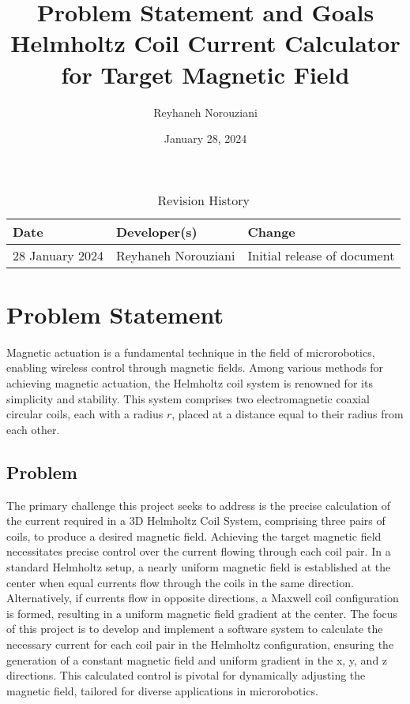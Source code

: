 \documentclass{article}
\title{Problem Statement and Goals\\Helmholtz Coil Current Calculator for Target Magnetic Field}
\author{Reyhaneh Norouziani}
\date{January 28, 2024}
\begin{document}
\maketitle

\begin{table}[hp]
\caption{Revision History} \label{TblRevisionHistory}
\begin{tabularx}{\textwidth}{llX}
\toprule
\textbf{Date} & \textbf{Developer(s)} & \textbf{Change}\\
\midrule
28 January 2024 & Reyhaneh Norouziani & Initial release of document\\

\bottomrule
\end{tabularx}
\end{table}

\section{Problem Statement}
Magnetic actuation is a fundamental technique in the field of microrobotics, enabling wireless control through magnetic fields. Among various methods for achieving magnetic actuation, the Helmholtz coil system is renowned for its simplicity and stability. This system comprises two electromagnetic coaxial circular coils, each with a radius  $r$, placed at a distance equal to their radius from each other.

\subsection{Problem}
The primary challenge this project seeks to address is the precise calculation of the current required in a 3D Helmholtz Coil System, comprising three pairs of coils, to produce a desired magnetic field. Achieving the target magnetic field necessitates precise control over the current flowing through each coil pair. In a standard Helmholtz setup, a nearly uniform magnetic field is established at the center when equal currents flow through the coils in the same direction. Alternatively, if currents flow in opposite directions, a Maxwell coil configuration is formed, resulting in a uniform magnetic field gradient at the center. The focus of this project is to develop and implement a software system to calculate the necessary current for each coil pair in the Helmholtz configuration, ensuring the generation of a constant magnetic field and uniform gradient in the x, y, and z directions. This calculated control is pivotal for dynamically adjusting the magnetic field, tailored for diverse applications in microrobotics.
\end{document}
